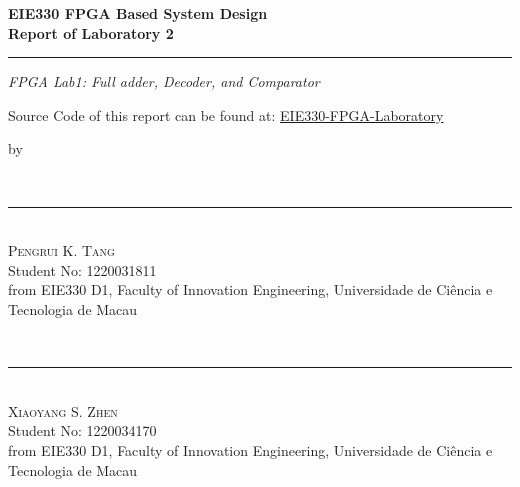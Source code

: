 \begin{titlepage}
    \ActivateWarningFilters[latex]

    \parbox{1\textwidth}{ %
        {\Large\bfseries EIE330 FPGA Based System Design}\\[0.5\baselineskip] %
        {\Huge\bfseries Report of Laboratory 2}\\[0.15\baselineskip] %
		\rule{1\textwidth}{1pt} %
        {\Large\textit{FPGA Lab1: Full adder, Decoder, and Comparator}}
    }
    \parbox{1\textwidth}{
        \vspace{1\baselineskip}
        \large
        Source Code of this report can be found at:
        \href{https://github.com/ZeppelinSCB/EIE330-FPGA-LAB-Report}
            {EIE330-FPGA-Laboratory}
    }
    \parbox{1\textwidth}{
        \vspace{1\baselineskip}
        \large by
    }
    \parbox{1\textwidth}{
        {~\\[1.7\baselineskip]}
        {\rule[1pt]{200pt}{1pt}} \\[1.25pt]
        {\huge\textsc{Pengrui K. Tang}
        }\\
        {\large{Student No: 1220031811}} \\
        \large from EIE330 D1, \newline
        Faculty of Innovation Engineering, \newline
        Universidade de Ciência e Tecnologia de Macau
    }
    \parbox{1\textwidth}{
        {~\\[1.7\baselineskip]}
        {\rule[1pt]{200pt}{1pt}} \\[1.25pt]
        {\huge\textsc{Xiaoyang S. Zhen}
            }\\
        {\large{Student No: 1220034170}} \\
        \large from EIE330 D1, \newline
        Faculty of Innovation Engineering, \newline
        Universidade de Ciência e Tecnologia de Macau
    }
	\FloatBarrier


\end{titlepage}
